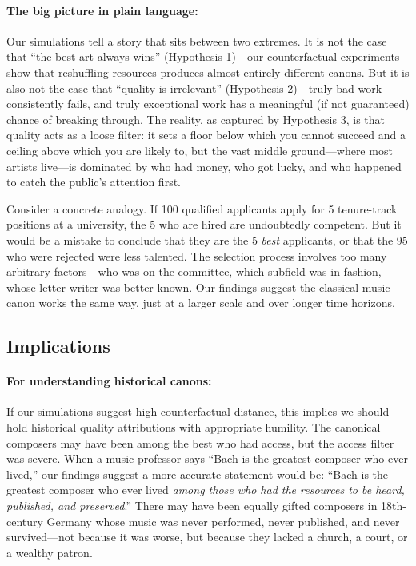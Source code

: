 \documentclass[11pt,a4paper]{article}
\begin{document}
\paragraph{The big picture in plain language:} Our simulations tell a story that sits between two extremes. It is not the case that ``the best art always wins'' (Hypothesis 1)---our counterfactual experiments show that reshuffling resources produces almost entirely different canons. But it is also not the case that ``quality is irrelevant'' (Hypothesis 2)---truly bad work consistently fails, and truly exceptional work has a meaningful (if not guaranteed) chance of breaking through. The reality, as captured by Hypothesis 3, is that quality acts as a loose filter: it sets a floor below which you cannot succeed and a ceiling above which you are likely to, but the vast middle ground---where most artists live---is dominated by who had money, who got lucky, and who happened to catch the public's attention first.

Consider a concrete analogy. If 100 qualified applicants apply for 5 tenure-track positions at a university, the 5 who are hired are undoubtedly competent. But it would be a mistake to conclude that they are the 5 \textit{best} applicants, or that the 95 who were rejected were less talented. The selection process involves too many arbitrary factors---who was on the committee, which subfield was in fashion, whose letter-writer was better-known. Our findings suggest the classical music canon works the same way, just at a larger scale and over longer time horizons.

\subsection{Implications}

\paragraph{For understanding historical canons:} If our simulations suggest high counterfactual distance, this implies we should hold historical quality attributions with appropriate humility. The canonical composers may have been among the best who had access, but the access filter was severe. When a music professor says ``Bach is the greatest composer who ever lived,'' our findings suggest a more accurate statement would be: ``Bach is the greatest composer who ever lived \textit{among those who had the resources to be heard, published, and preserved}.'' There may have been equally gifted composers in 18th-century Germany whose music was never performed, never published, and never survived---not because it was worse, but because they lacked a church, a court, or a wealthy patron.
\end{document}
